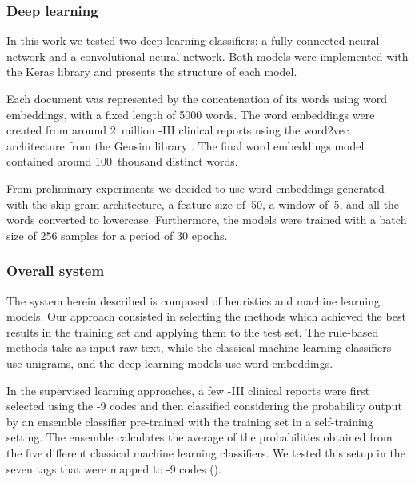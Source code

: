 


\subsubsection{Deep learning}

In this work we tested two deep learning classifiers: a fully connected neural network and a convolutional neural network.
Both models were implemented with the Keras library and  presents the structure of each model.

Each document was represented by the concatenation of its words using word embeddings, with a fixed length of 5000 words.
The word embeddings were created from around 2~million -III clinical reports using the word2vec architecture \parencite{mikolov2013b} from the Gensim library \parencite{rehurek2010a}.
The final word embeddings model contained around 100~thousand distinct words.

From preliminary experiments we decided to use word embeddings generated with the skip-gram architecture, a feature size of~50, a window of~5, and all the words converted to lowercase.
Furthermore, the models were trained with a batch size of 256 samples for a period of 30 epochs.




\subsubsection{Overall system}

The system herein described is composed of heuristics and machine learning models.
Our approach consisted in selecting the methods which achieved the best results in the training set and applying them to the test set.
The rule-based methods take as input raw text, while the classical machine learning classifiers use  unigrams, and the deep learning models use word embeddings.

In the supervised learning approaches, a few -III clinical reports were first selected using the -9 codes and then classified considering the probability output by an ensemble classifier pre-trained with the training set in a self-training setting.
The ensemble calculates the average of the probabilities obtained from the five different classical machine learning classifiers.
We tested this setup in the seven tags that were mapped to -9 codes ().

